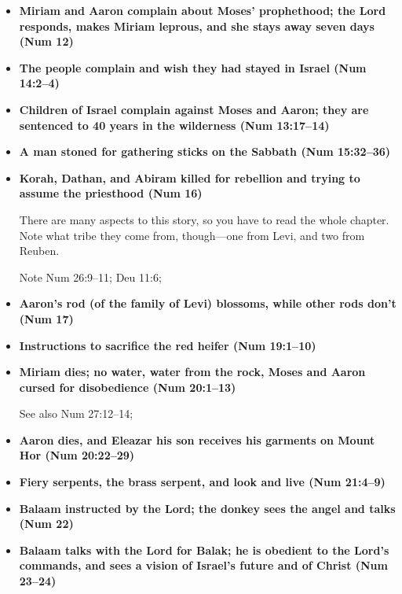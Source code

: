 \begin{itemize}
	Includes this verse, verse 29: ``And Moses said unto him, Enviest thou for my sake? would God that all the LORD's people were prophets, and that the LORD would put his spirit upon them!''

\item \textbf{Miriam and Aaron complain about Moses' prophethood; the Lord responds, makes Miriam leprous, and she stays away seven days (Num 12)}

\item \textbf{The people complain and wish they had stayed in Israel (Num 14:2--4)}

\item \textbf{Children of Israel complain against Moses and Aaron; they are sentenced to 40 years in the wilderness (Num 13:17--14)}

\item \textbf{A man stoned for gathering sticks on the Sabbath (Num 15:32--36)}

\item \textbf{Korah, Dathan, and Abiram killed for rebellion and trying to assume the priesthood (Num 16)}

	There are many aspects to this story, so you have to read the whole chapter. Note what tribe they come from, though---one from Levi, and two from Reuben.

	Note Num 26:9--11; Deu 11:6;

\item \textbf{Aaron's rod (of the family of Levi) blossoms, while other rods don't (Num 17)}

\item \textbf{Instructions to sacrifice the red heifer (Num 19:1--10)}

\item \textbf{Miriam dies; no water, water from the rock, Moses and Aaron cursed for disobedience (Num 20:1--13)}

	See also Num 27:12--14;

\item \textbf{Aaron dies, and Eleazar his son receives his garments on Mount Hor (Num 20:22--29)}

\item \textbf{Fiery serpents, the brass serpent, and look and live (Num 21:4--9)}

\item \textbf{Balaam instructed by the Lord; the donkey sees the angel and talks (Num 22)}

\item \textbf{Balaam talks with the Lord for Balak; he is obedient to the Lord's commands, and sees a vision of Israel's future and of Christ (Num 23--24)}


\end{itemize}
